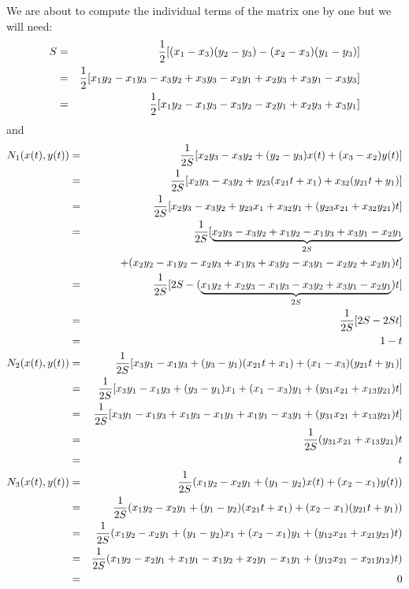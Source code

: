 We are about to compute the individual terms of the matrix
one by one but we will need:
\begin{eqnarray}
S
&=& \frac{1}{2} [(x_1-x_3)(y_2-y_3)-(x_2-x_3)(y_1-y_3)]  \nonumber\\
&=&  \frac{1}{2} [x_1y_2 -x_1y_3 -x_3y_2 + x_3y_3 -x_2y_1 + x_2y_3 + x_3y_1 - x_3y_3] \nonumber\\
&=&  \frac{1}{2} [x_1y_2 -x_1y_3 -x_3y_2 -x_2y_1 + x_2y_3 + x_3y_1 ] \nonumber\\
\end{eqnarray}
and 
\begin{eqnarray}
N_1(x(t),y(t)) 
&=&\frac{1}{2S} [  x_2y_3-x_3y_2+(y_2-y_3)x(t)+(x_3-x_2)y(t) ] \nonumber\\
&=&\frac{1}{2S} [  x_2y_3-x_3y_2+y_{23}(x_{21} t +x_1)  +x_{32}  (y_{21} t+y_1) ] \nonumber\\
&=&\frac{1}{2S} [ x_2y_3-x_3y_2 +y_{23}x_1+x_{32}y_1 + (y_{23}x_{21}+x_{32}y_{21}) t  ] \nonumber\\
&=&\frac{1}{2S} [ \underbrace{x_2y_3-x_3y_2 +x_1y_2-x_1y_3 +x_{3}y_1-x_2y_1}_{2S} \\ 
&& + (x_2y_2-x_1y_2-x_2y_3+x_1y_3 + x_3y_2 - x_3y_1 - x_2y_2 + x_2y_1  ) t  ]  \nonumber\\
&=&\frac{1}{2S} [ 2S - (\underbrace{x_1y_2+x_2y_3-x_1y_3 - x_3y_2 + x_3y_1 - x_2y_1}_{2S}  ) t  ]  \nonumber\\
&=&\frac{1}{2S} [ 2S - 2S  t  ] \nonumber\\
&=&1-t \\
N_2(x(t),y(t)) 
&=& \frac{1}{2S} [ x_3y_1-x_1y_3+(y_3-y_1)(x_{21} t +x_1)+(x_1-x_3)(y_{21} t+y_1)  ] \nonumber\\
&=& \frac{1}{2S} [ x_3y_1-x_1y_3+(y_3-y_1)x_1+(x_1-x_3)y_1 + (y_{31}x_{21}+x_{13}y_{21}) t ] \nonumber\\
&=& \frac{1}{2S} [ x_3y_1-x_1y_3+x_1y_3 -x_1y_1+ x_1y_1 -x_3y_1 + (y_{31}x_{21}+x_{13}y_{21}) t ] \nonumber\\
&=& \frac{1}{2S}   (y_{31}x_{21}+x_{13}y_{21}) t  \nonumber\\
&=& t \\ 
N_3(x(t),y(t)) 
&=& \frac{1}{2S} ( x_1y_2-x_2y_1+(y_1-y_2)x(t)+(x_2-x_1)y(t)   ) \nonumber\\
&=& \frac{1}{2S} ( x_1y_2-x_2y_1+(y_1-y_2)( x_{21} t +x_1 )+(x_2-x_1)(y_{21} t+y_1 )   ) \nonumber\\
&=& \frac{1}{2S} ( x_1y_2-x_2y_1+(y_1-y_2)x_1 +(x_2-x_1)y_1 + (y_{12}x_{21}+x_{21}y_{21})t  ) \nonumber\\
&=& \frac{1}{2S} ( x_1y_2-x_2y_1+x_1y_1-x_1y_2 +x_2y_1-x_1y_1 + (y_{12}x_{21}-x_{21}y_{12})t     ) \nonumber\\
&=& 0
\end{eqnarray}


